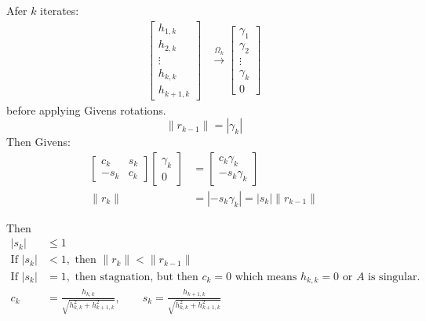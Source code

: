 Afer $k$ iterates:
\begin{align*}
    \begin{bmatrix}
        h_{1,k} \\
        h_{2,k} \\
        \vdots  \\
        h_{k,k} \\
        h_{k+1,k}
    \end{bmatrix} & \xrightarrow{\Omega_k} \begin{bmatrix}
                                               \gamma_1 \\
                                               \gamma_2 \\
                                               \vdots   \\
                                               \gamma_k \\
                                               0
                                           \end{bmatrix}
\end{align*}
before applying Givens rotations.
\[
    \|r_{k-1}\| = |\gamma_k|
\]
Then Givens:
\begin{align*}
    \begin{bmatrix}
        c_k  & s_k \\
        -s_k & c_k
    \end{bmatrix} \begin{bmatrix}
                      \gamma_k \\
                      0
                  \end{bmatrix} & = \begin{bmatrix}
                                        c_k \gamma_k \\
                                        -s_k \gamma_k
                                    \end{bmatrix}                        \\
    \|r_k\|                       & = |-s_k \gamma_k| = |s_k| \|r_{k-1}\|
\end{align*}

Then
\begin{align*}
    |s_k|            & \leq 1                                                                                                               \\
    \text{If } |s_k| & < 1, \text{ then } \|r_k\| < \|r_{k-1}\|                                                                             \\
    \text{If } |s_k| & = 1, \text{ then stagnation, but then } c_k = 0 \text{ which means } h_{k, k} = 0 \text{ or } A \text{ is singular.} \\
    c_k              & = \frac{h_{k,k}}{\sqrt{h_{k,k}^2 + h_{k+1,k}^2}}, \qquad s_k = \frac{h_{k+1,k}}{\sqrt{h_{k,k}^2 + h_{k+1,k}^2}}
\end{align*}

